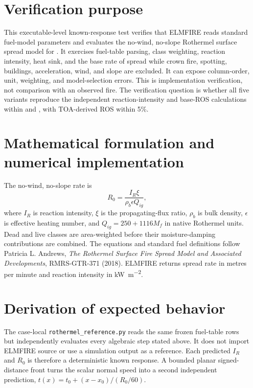 \section{Verification purpose}
This executable-level known-response test verifies that ELMFIRE reads standard fuel-model parameters and evaluates the no-wind, no-slope Rothermel surface spread model for \FuelSet.  It exercises fuel-table parsing, class weighting, reaction intensity, heat sink, and the base rate of spread while crown fire, spotting, buildings, acceleration, wind, and slope are excluded.  It can expose column-order, unit, weighting, and model-selection errors.  This is implementation verification, not comparison with an observed fire.  The verification question is whether all five variants reproduce the independent reaction-intensity and base-ROS calculations within \IrTolerance{} and \RosTolerance{}, with TOA-derived ROS within 5\%.

\section{Mathematical formulation and numerical implementation}
The no-wind, no-slope rate is
\begin{equation}R_0=\frac{I_R\xi}{\rho_b\epsilon Q_{ig}},\end{equation}
where $I_R$ is reaction intensity, $\xi$ is the propagating-flux ratio, $\rho_b$ is bulk density, $\epsilon$ is effective heating number, and $Q_{ig}=250+1116M_f$ in native Rothermel units.  Dead and live classes are area-weighted before their moisture-damping contributions are combined.  The equations and standard fuel definitions follow Patricia L. Andrews, \emph{The Rothermel Surface Fire Spread Model and Associated Developments}, RMRS-GTR-371 (2018).  ELMFIRE returns spread rate in metres per minute and reaction intensity in \si{kW.m^{-2}}.

\section{Derivation of expected behavior}
The case-local \texttt{rothermel\_reference.py} reads the same frozen fuel-table rows but independently evaluates every algebraic step stated above.  It does not import ELMFIRE source or use a simulation output as a reference.  Each predicted $I_R$ and $R_0$ is therefore a deterministic known response.  A bounded planar signed-distance front turns the scalar normal speed into a second independent prediction, $t(x)=t_0+(x-x_0)/(R_0/60)$.

